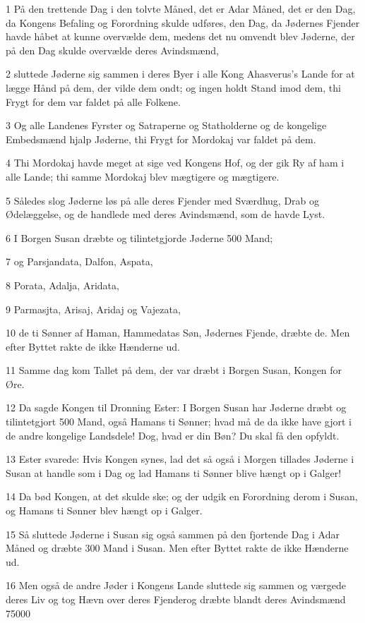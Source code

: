 \par 1 På den trettende Dag i den tolvte Måned, det er Adar Måned, det er den Dag, da Kongens Befaling og Forordning skulde udføres, den Dag, da Jødernes Fjender havde håbet at kunne overvælde dem, medens det nu omvendt blev Jøderne, der på den Dag skulde overvælde deres Avindsmænd,
\par 2 sluttede Jøderne sig sammen i deres Byer i alle Kong Ahasverus's Lande for at lægge Hånd på dem, der vilde dem ondt; og ingen holdt Stand imod dem, thi Frygt for dem var faldet på alle Folkene.
\par 3 Og alle Landenes Fyrster og Satraperne og Statholderne og de kongelige Embedsmænd hjalp Jøderne, thi Frygt for Mordokaj var faldet på dem.
\par 4 Thi Mordokaj havde meget at sige ved Kongens Hof, og der gik Ry af ham i alle Lande; thi samme Mordokaj blev mægtigere og mægtigere.
\par 5 Således slog Jøderne løs på alle deres Fjender med Sværdhug, Drab og Ødelæggelse, og de handlede med deres Avindsmænd, som de havde Lyst.
\par 6 I Borgen Susan dræbte og tilintetgjorde Jøderne 500 Mand;
\par 7 og Parsjandata, Dalfon, Aspata,
\par 8 Porata, Adalja, Aridata,
\par 9 Parmasjta, Arisaj, Aridaj og Vajezata,
\par 10 de ti Sønner af Haman, Hammedatas Søn, Jødernes Fjende, dræbte de. Men efter Byttet rakte de ikke Hænderne ud.
\par 11 Samme dag kom Tallet på dem, der var dræbt i Borgen Susan, Kongen for Øre.
\par 12 Da sagde Kongen til Dronning Ester: I Borgen Susan har Jøderne dræbt og tilintetgjort 500 Mand, også Hamans ti Sønner; hvad må de da ikke have gjort i de andre kongelige Landsdele! Dog, hvad er din Bøn? Du skal få den opfyldt.
\par 13 Ester svarede: Hvis Kongen synes, lad det så også i Morgen tillades Jøderne i Susan at handle som i Dag og lad Hamans ti Sønner blive hængt op i Galger!
\par 14 Da bød Kongen, at det skulde ske; og der udgik en Forordning derom i Susan, og Hamans ti Sønner blev hængt op i Galger.
\par 15 Så sluttede Jøderne i Susan sig også sammen på den fjortende Dag i Adar Måned og dræbte 300 Mand i Susan. Men efter Byttet rakte de ikke Hænderne ud.
\par 16 Men også de andre Jøder i Kongens Lande sluttede sig sammen og værgede deres Liv og tog Hævn over deres Fjenderog dræbte blandt deres Avindsmænd 75000
